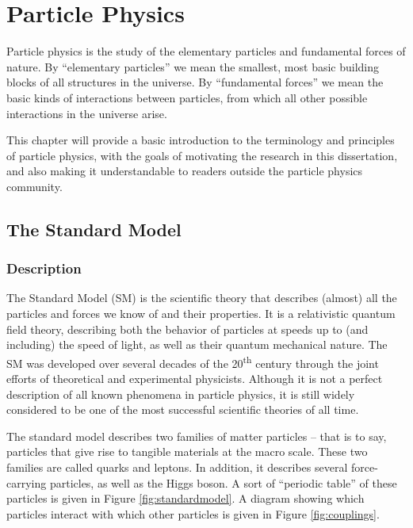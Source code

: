 \chapter{Particle Physics}
\label{chap:particlephysics}

Particle physics is the study of the elementary particles and fundamental forces
of nature. By ``elementary particles'' we mean the smallest, most
basic building blocks of all structures in the universe. By
``fundamental forces'' we mean the basic kinds of interactions between
particles, from which all other possible interactions in the universe
arise.

This chapter will provide a basic introduction to the terminology
and principles of particle physics, with the goals of motivating the
research in this dissertation, and also making it understandable to
readers outside the particle physics community.

\section{The Standard Model}
\label{sec:standardmodel}

\subsection{Description}
\label{ssec:SMdescription}

The Standard Model (SM) is the scientific theory that describes
(almost) all the particles and forces we know of and their properties.
It is a relativistic quantum field theory, describing both the
behavior of particles at speeds up to (and including) the speed of
light, as well as their quantum mechanical nature.
The SM was developed over several decades of the 20\textsuperscript{th}
century through the joint efforts of theoretical and experimental physicists.
Although it is not a perfect description of all known phenomena in
particle physics, it is still widely considered to be one of the most
successful scientific theories of all time. %

The standard model describes two families of matter particles -- that is
to say, particles that give rise to tangible materials at the macro scale.
These two families are called quarks and leptons. In addition, it
describes several force-carrying particles, as well as the Higgs
boson. A sort of ``periodic table'' of these particles is given in
Figure \ref{fig:standardmodel}. A diagram showing which particles
interact with which other particles is given in Figure \ref{fig:couplings}.

